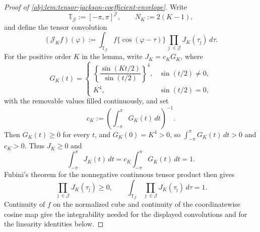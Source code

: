 \documentclass[11pt]{article}
\begin{document}
\begin{proof}[Proof of \cref{obj:lem:tensor-jackson-coefficient-envelope}]
Write
\[
\mathbb T_{\mathcal J}:=[-\pi,\pi]^{\mathcal J},
\qquad
N_K:=2(K-1),
\]
and define the tensor convolution
\[
(\mathcal J_K f)(\varphi)
:=
\int_{\mathbb T_{\mathcal J}}
f\{\cos(\varphi-\tau)\}
\prod_{\jmath\in\mathcal J}J_K(\tau_\jmath)\,d\tau .
\]
For the positive order \(K\) in the lemma, write \(J_K=c_KG_K\), where
\[
G_K(t)=
\begin{cases}
\left\{\dfrac{\sin(Kt/2)}{\sin(t/2)}\right\}^{4},& \sin(t/2)\ne0,\\[1ex]
K^4,& \sin(t/2)=0,
\end{cases}
\]
with the removable values filled continuously, and set
\[
c_K:=\left(\int_{-\pi}^{\pi}G_K(t)\,dt\right)^{-1}.
\]
Then \(G_K(t)\ge0\) for every \(t\), and \(G_K(0)=K^4>0\), so \(\int_{-\pi}^{\pi}G_K(t)\,dt>0\) and \(c_K>0\).  Thus \(J_K\ge0\) and
\[
\int_{-\pi}^{\pi}J_K(t)\,dt
=
c_K\int_{-\pi}^{\pi}G_K(t)\,dt
=1 .
\]
Fubini's theorem for the nonnegative continuous tensor product then gives
\[
\prod_{\jmath\in\mathcal J}J_K(\tau_\jmath)\ge 0,
\qquad
\int_{\mathbb T_{\mathcal J}}
\prod_{\jmath\in\mathcal J}J_K(\tau_\jmath)\,d\tau=1 .
\]
Continuity of \(f\) on the normalized cube and continuity of the coordinatewise cosine map give the integrability needed for the displayed convolutions and for the linearity identities below. %


\end{proof}
\end{document}
